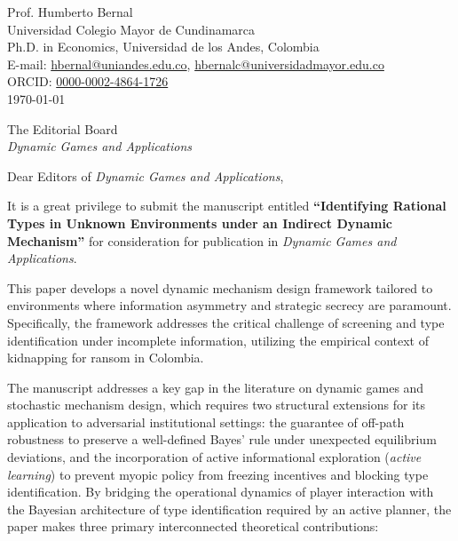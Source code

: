 \documentclass[12pt]{article}
\begin{document}
\singlespacing

\begin{flushright}
Prof. Humberto Bernal \\
Universidad Colegio Mayor de Cundinamarca \\
Ph.D. in Economics, Universidad de los Andes, Colombia \\
E-mail: \href{mailto:hbernal@uniandes.edu.co}{hbernal@uniandes.edu.co}, \href{mailto:hbernalc@universidadmayor.edu.co}{hbernalc@universidadmayor.edu.co} \\
ORCID: \href{https://orcid.org/0000-0002-4864-1726}{0000-0002-4864-1726} \\
\today
\end{flushright}

\vspace{1.5em}

\begin{flushleft}
The Editorial Board \\
\textit{Dynamic Games and Applications}
\end{flushleft}

\vspace{1.5em}

\noindent Dear Editors of \textit{Dynamic Games and Applications},

\vspace{1.5em}

\noindent It is a great privilege to submit the manuscript entitled \textbf{``Identifying Rational Types in Unknown Environments under an Indirect Dynamic Mechanism''} for consideration for publication in \textit{Dynamic Games and Applications}.

This paper develops a novel dynamic mechanism design framework tailored to environments where information asymmetry and strategic secrecy are paramount. Specifically, the framework addresses the critical challenge of screening and type identification under incomplete information, utilizing the empirical context of kidnapping for ransom in Colombia. 

The manuscript addresses a key gap in the literature on dynamic games and stochastic mechanism design, which requires two structural extensions for its application to adversarial institutional settings: the guarantee of off-path robustness to preserve a well-defined Bayes' rule under unexpected equilibrium deviations, and the incorporation of active informational exploration (\textit{active learning}) to prevent myopic policy from freezing incentives and blocking type identification. By bridging the operational dynamics of player interaction with the Bayesian architecture of type identification required by an active planner, the paper makes three primary interconnected theoretical contributions:
\end{document}
